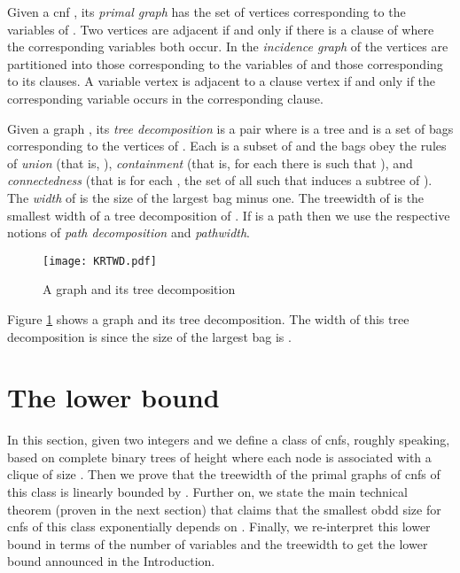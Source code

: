 \documentclass{article}
\newtheorem{theorem}{Theorem}
\begin{document}
Given a {\sc cnf} , its \emph{primal graph} has the set of vertices corresponding to the variables of .
Two vertices are adjacent if and only if there is a clause of  where the
corresponding variables both occur. In the \emph{incidence graph}
of  the vertices are partitioned into those corresponding to the variables of  and those corresponding to its
clauses. A variable vertex is adjacent to a clause vertex if and only if the corresponding variable occurs in the
corresponding clause. 

Given a graph , its \emph{tree decomposition} is a pair  where  
is a tree and  is a set of bags  corresponding to the vertices  of .
Each  is a subset of  and the bags obey the rules of \emph{union} (that is, ),
\emph{containment} (that is, for each  there is  such that ),
and \emph{connectedness} (that is for each , the set of all  such that  induces a subtree of ).
The \emph{width} of  is the size of the largest bag minus one. The treewidth of  is the smallest width of a tree
decomposition of . If  is a path then we use the respective notions of \emph{path decomposition} and \emph{pathwidth}. 


\begin{figure} [h]
\centering
\texttt{[image: KRTWD.pdf]}
\caption{A graph and its tree decomposition}
\label{TWDPic}
\end{figure}

Figure \ref{TWDPic} shows a graph and its tree decomposition.
The width of this tree decomposition is  since the size of the largest bag
is .

\section{The lower bound} \label{lbmain}
\begin{comment}
\begin{theorem}
Given a parameter  there is a family
 of CNFs such that each 
has  variables and  treewidth of the primal graph
and the smallest OBDD realizing each  is of size .
\end{theorem}
\end{comment}
In this section, given two integers  and  we define a class of {\sc cnf}s, 
roughly speaking, based on complete binary trees of height  where each node is associated 
with a clique of size . Then we prove that the treewidth of the primal graphs of {\sc cnf}s of this
class is linearly bounded by . Further on, we state the main technical theorem (proven in the next
section) that claims that the smallest {\sc obdd} size for {\sc cnf}s of this class exponentially depends
on . Finally, we re-interpret this lower bound in terms of the number of variables and the treewidth to get
the lower bound announced in the Introduction.
\end{document}

